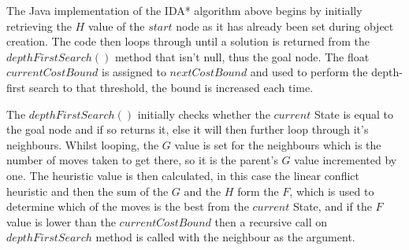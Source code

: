 \documentclass[progress]{cmpreport}
\begin{document}
The Java implementation of the IDA* algorithm above begins by initially retrieving the $H$ value of the $start$ node as it has already been set during object creation. The code then loops through until a solution is returned from the $depthFirstSearch()$ method that isn't null, thus the goal node. The float $currentCostBound$ is assigned to $nextCostBound$ and used to perform the depth-first search to that threshold, the bound is increased each time. 

The $depthFirstSearch()$ initially checks whether the $current$ State is equal to the goal node and if so returns it, else it will then further loop through it's neighbours. Whilst looping, the $G$ value is set 
for the neighbours which is the number of moves taken to get there, so it is the parent's $G$ value incremented by one. The heuristic value is then calculated, in this case the linear conflict heuristic and then the sum of the $G$ and the $H$ form the $F$, which is used to determine which of the moves is the best from the $current$ State, and if the $F$ value is lower than the $currentCostBound$ then a recursive call on $depthFirstSearch$ method is called with the neighbour as the argument. 
\end{document}
